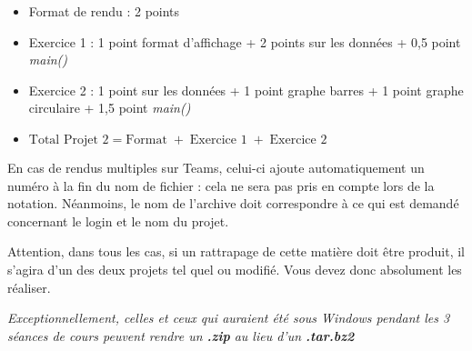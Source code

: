 \documentclass[12pt,a4paper]{article}
\begin{document}
\begin{itemize}
\item Format de rendu : 2 points
\item Exercice 1 : 1 point format d'affichage + 2 points sur les données + 0,5 point \textit{main()}
\item Exercice 2 : 1 point sur les données + 1 point graphe barres + 1 point graphe circulaire + 1,5 point \textit{main()}
\item $ \text{Total Projet 2} = \text{Format} \; + \; \text{Exercice 1} \; + \; \text{Exercice 2} $
\end{itemize}

\bigskip

\noindent En cas de rendus multiples sur Teams, celui-ci ajoute automatiquement un numéro à la fin du nom de fichier : cela ne sera pas pris en compte lors de la notation.
Néanmoins, le nom de l'archive doit correspondre à ce qui est demandé concernant le login et le nom du projet.

\bigskip

\noindent Attention, dans tous les cas, si un rattrapage de cette matière doit être produit, il s'agira d'un des deux projets tel quel ou modifié.
Vous devez donc absolument les réaliser.

\bigskip

\noindent \textit{Exceptionnellement, celles et ceux qui auraient été sous Windows pendant les 3 séances de cours peuvent rendre un \textbf{.zip} au lieu d'un \textbf{.tar.bz2}}
\end{document}
